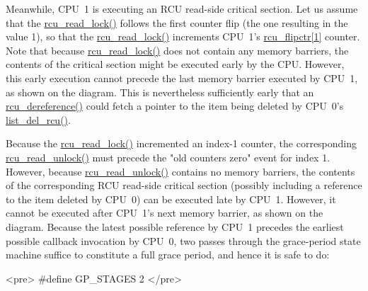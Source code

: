 Meanwhile, CPU~1 is executing an RCU read-side critical section.
Let us assume that the \url{rcu_read_lock()} follows the first
counter flip (the one resulting in the value 1), so that the
\url{rcu_read_lock()} increments CPU~1's
\url{rcu_flipctr[1]} counter.
Note that because \url{rcu_read_lock()} does not contain any
memory barriers, the contents of the critical section might be executed
early by the CPU.
However, this early execution cannot precede the last memory barrier
executed by CPU~1, as shown on the diagram.
This is nevertheless sufficiently early that an \url{rcu_dereference()}
could fetch a pointer to the item being deleted by CPU~0's
\url{list_del_rcu()}.

Because the \url{rcu_read_lock()} incremented an index-1 counter,
the corresponding \url{rcu_read_unlock()} must
precede the "old counters zero" event for index 1.
However, because \url{rcu_read_unlock()} contains no memory
barriers, the contents of the corresponding RCU read-side critical
section (possibly including a reference to the item deleted by
CPU~0) can be executed late by CPU~1.
However, it cannot be executed after CPU~1's next memory barrier,
as shown on the diagram.
Because the latest possible reference by CPU~1 precedes the
earliest possible callback invocation by CPU~0, two passes
through the grace-period state machine suffice to constitute
a full grace period, and hence it is safe to do:

<pre>    #define GP_STAGES 2
</pre>

